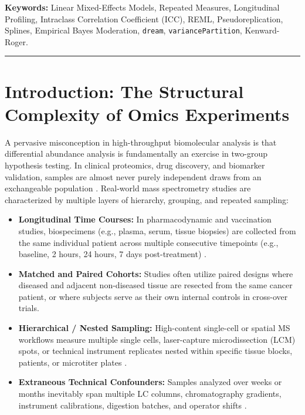 \documentclass[11pt,twoside,openright]{book}
\begin{document}
\noindent\textbf{Keywords:} Linear Mixed-Effects Models, Repeated Measures, Longitudinal Profiling, Intraclass Correlation Coefficient (ICC), REML, Pseudoreplication, Splines, Empirical Bayes Moderation, \texttt{dream}, \texttt{variancePartition}, Kenward-Roger.

\vspace{0.8em}
\noindent\rule{\textwidth}{0.4pt}

\section{Introduction: The Structural Complexity of Omics Experiments}

A pervasive misconception in high-throughput biomolecular analysis is that differential abundance analysis is fundamentally an exercise in two-group hypothesis testing. In clinical proteomics, drug discovery, and biomarker validation, samples are almost never purely independent draws from an exchangeable population \cite{boland2023health}. Real-world mass spectrometry studies are characterized by multiple layers of hierarchy, grouping, and repeated sampling:
\begin{itemize}
    \item \textbf{Longitudinal Time Courses:} In pharmacodynamic and vaccination studies, biospecimens (e.g., plasma, serum, tissue biopsies) are collected from the same individual patient across multiple consecutive timepoints (e.g., baseline, 2 hours, 24 hours, 7 days post-treatment) \cite{fitzmaurice2012applied}.
    \item \textbf{Matched and Paired Cohorts:} Studies often utilize paired designs where diseased and adjacent non-diseased tissue are resected from the same cancer patient, or where subjects serve as their own internal controls in cross-over trials.
    \item \textbf{Hierarchical / Nested Sampling:} High-content single-cell or spatial MS workflows measure multiple single cells, laser-capture microdissection (LCM) spots, or technical instrument replicates nested within specific tissue blocks, patients, or microtiter plates \cite{gatto2023qfeatures}.
    \item \textbf{Extraneous Technical Confounders:} Samples analyzed over weeks or months inevitably span multiple LC columns, chromatography gradients, instrument calibrations, digestion batches, and operator shifts \cite{leek2010tackling, johnson2007adjusting, broadhurst2018guidelines}.
\end{itemize}
\end{document}
